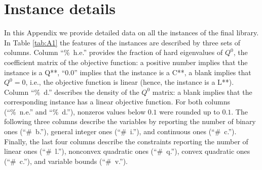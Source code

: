 
\section{Instance details}\label{sec:instance_details}


In this Appendix we provide detailed data on all the instances of the final library. 
In Table \ref{tab:A1} the features of the instances are described by three sets of columns. Column ``\%~h.e.'' provides the fraction of hard eigenvalues of $Q^0$, the coefficient matrix of the objective function: a positive number implies that the instance is a Q**, ``0.0'' implies that the instance is a C**, a blank implies that $Q^0 = 0$, i.e., the objective function is linear (hence, the instance is a L**). 
Column ``\%~d.'' describes the density of the $Q^0$ matrix: a blank implies that the corresponding instance has a linear objective function.
For both columns (``\%~n.e.'' and ``\%~d.''), nonzeros values below $0.1$ were rounded up to $0.1$.
The following three columns describe the variables by reporting the number of binary ones (``\#~b.''), general integer ones (``\#~i.''), and continuous ones (``\#~c.''). Finally, the last four columns describe the constraints reporting the number of linear ones (``\#~l.''), nonconvex quadratic ones (``\#~q.''), convex quadratic ones (``\#~c.''), and variable bounds (``\#~v.''). 



